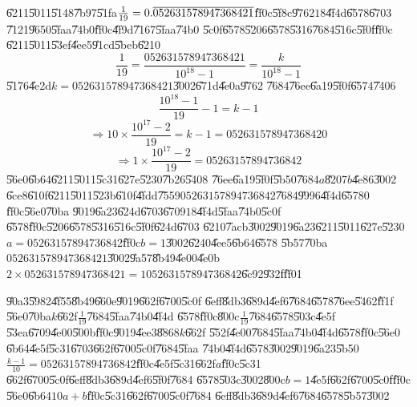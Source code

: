 \documentclass{article}
\begin{document}
\U{6211}\U{5011}\U{5148}\U{7b97}\U{51fa}$\frac{1}{19}=0.\overline{%
052631578947368421}$\U{ff0c}\U{5f8c}\U{9762}$18$\U{4f4d}\U{6578}\U{6703}%
\U{7121}\U{9650}\U{5faa}\U{74b0}\U{ff0c}\U{4f9d}\U{7167}\U{5faa}\U{74b0}%
\U{5c0f}\U{6578}\U{5206}\U{6578}\U{5316}\U{7684}\U{516c}\U{5f0f}\U{ff0c}%
\U{6211}\U{5011}\U{53ef}\U{4ee5}\U{91cd}\U{5beb}\U{6210}%
\[
\frac{1}{19}=\frac{052631578947368421}{10^{18}-1}=\frac{k}{10^{18}-1} 
\]%
\U{5176}\U{4e2d}$k=052631578947368421$\U{3002}\U{671d}\U{4e0a}\U{9762}%
\U{7684}\U{76ee}\U{6a19}\U{5f0f}\U{6574}\U{7406}%
\[
\frac{10^{18}-1}{19}-1=k-1 
\]%
\[
\Rightarrow 10\times \frac{10^{17}-2}{19}=k-1=052631578947368420 
\]%
\[
\Rightarrow 1\times \frac{10^{17}-2}{19}=05263157894736842 
\]%
\U{56e0}\U{6b64}\U{6211}\U{5011}\U{5c31}\U{627e}\U{5230}\U{7b26}\U{5408}%
\U{76ee}\U{6a19}\U{5f0f}\U{5b50}\U{7684}$a$\U{8207}$b$\U{4e86}\U{3002}%
\U{6ce8}\U{610f}\U{6211}\U{5011}\U{523b}\U{610f}\U{4fdd}\U{7559}$%
05263157894736842$\U{7684}\U{9996}\U{4f4d}\U{6578}$0$\U{ff0c}\U{56e0}\U{70ba}%
\U{9019}\U{6a23}\U{624d}\U{6703}\U{6709}$18$\U{4f4d}\U{5faa}\U{74b0}\U{5c0f}%
\U{6578}\U{ff0c}\U{5206}\U{6578}\U{5316}\U{516c}\U{5f0f}\U{624d}\U{6703}%
\U{6210}\U{7acb}\U{3002}\U{9019}\U{6a23}\U{6211}\U{5011}\U{627e}\U{5230}$%
a=05263157894736842$\U{ff0c}$b=1$\U{3002}\U{6240}\U{4ee5}\U{6b64}\U{6578}%
\U{5b57}\U{70ba}$052631578947368421$\U{3002}\U{9a57}\U{8b49}\U{4e00}\U{4e0b}$%
2\times 052631578947368421=105263157894736842$\U{6c92}\U{932f}\U{ff01}

\bigskip

\U{90a3}\U{5982}\U{4f55}\U{8b49}\U{660e}\U{9019}\U{662f}\U{6700}\U{5c0f}%
\U{6eff}\U{8db3}\U{689d}\U{4ef6}\U{7684}\U{6578}\U{76ee}\U{5462}\U{ff1f}%
\U{56e0}\U{70ba}$k$\U{662f}$\frac{1}{19}$\U{7684}\U{5faa}\U{74b0}\U{4f4d}%
\U{6578}\U{ff0c}\U{800c}$\frac{1}{19}$\U{7684}\U{6578}\U{503c}\U{4e5f}%
\U{53ea}\U{6709}\U{4e00}\U{500b}\U{ff0c}\U{9019}\U{4ee3}\U{8868}$k$\U{662f}%
\U{552f}\U{4e00}\U{7684}\U{5faa}\U{74b0}\U{4f4d}\U{6578}\U{ff0c}\U{56e0}%
\U{6b64}\U{4e5f}\U{5c31}\U{6703}\U{662f}\U{6700}\U{5c0f}\U{7684}\U{5faa}%
\U{74b0}\U{4f4d}\U{6578}\U{3002}\U{9019}\U{6a23}\U{5b50}$\frac{k-1}{10}%
=05263157894736842$\U{ff0c}\U{4e5f}\U{5c31}\U{662f}$a$\U{ff0c}\U{5c31}%
\U{662f}\U{6700}\U{5c0f}\U{6eff}\U{8db3}\U{689d}\U{4ef6}\U{5f0f}\U{7684}%
\U{6578}\U{503c}\U{3002}\U{800c}$b=1$\U{4e5f}\U{662f}\U{6700}\U{5c0f}\U{ff0c}%
\U{56e0}\U{6b64}$10a+b$\U{ff0c}\U{5c31}\U{662f}\U{6700}\U{5c0f}\U{7684}%
\U{6eff}\U{8db3}\U{689d}\U{4ef6}\U{7684}\U{6578}\U{5b57}\U{3002}

\bigskip
\end{document}
